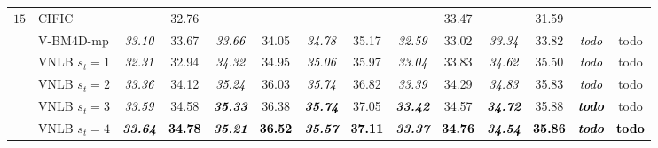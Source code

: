 \documentclass[10pt, journal, twocolumn, final, a4paper]{IEEEtran}
\newcommand{\best}[1]{#1}
\newcommand{\bsic}[1]{\textcolor{black}{\textit{#1}}}
\newcommand{\Bsic}[1]{\textcolor{black}{\textbf{\textit{#1}}}}
\newcommand{\Best}[1]{\textbf{\textcolor{black}{#1}}}
\begin{document}
\begin{table}[htp!]
\begin{center}
{\begin{tabular}{ c | l |c c | c c | c c | c c | c c | c c}
%                                                                                                                                                                                                                                         
			\multirow{1}{*}{$15$}
			                      & CIFIC                & \bsic{     } &       32.76  & \bsic{     } &              & \bsic{     } &              & \bsic{     } &       33.47  & \bsic{     } &       31.59  & \bsic{     } &              \\
			                      & V-BM4D-mp            & \bsic{33.10} &       33.67  & \bsic{33.66} &       34.05  & \bsic{34.78} &       35.17  & \bsic{32.59} &       33.02  & \bsic{33.34} &       33.82  & \bsic{todo } &       todo   \\
			                      & VNLB   $s_t = 1$     & \bsic{32.31} &       32.94  & \bsic{34.32} &       34.95  & \bsic{35.06} &       35.97  & \bsic{33.04} &       33.83  & \bsic{34.62} &       35.50  & \bsic{todo } &       todo   \\
			                      & VNLB   $s_t = 2$     & \bsic{33.36} &       34.12  & \bsic{35.24} &       36.03  & \bsic{35.74} &       36.82  & \bsic{33.39} &       34.29  & \bsic{34.83} &       35.83  & \bsic{todo } &       todo   \\
			                      & VNLB   $s_t = 3$     & \bsic{33.59} &       34.58  & \Bsic{35.33} &       36.38  & \Bsic{35.74} &       37.05  & \Bsic{33.42} &       34.57  & \Bsic{34.72} &       35.88  & \Bsic{todo } &       todo   \\
			                      & VNLB   $s_t = 4$     & \Bsic{33.64} & \Best{34.78} & \Bsic{35.21} & \Best{36.52} & \Bsic{35.57} & \Best{37.11} & \Bsic{33.37} & \Best{34.76} & \Bsic{34.54} & \Best{35.86} & \Bsic{todo } & \Best{todo } \\\hline
%                                                                                                                                                                                                                                         

\end{tabular}}
\end{center}
\end{table}
\end{document}
